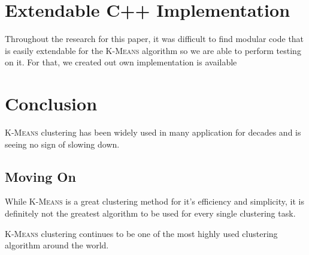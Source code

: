 \documentclass[12pt]{dalthesis}
\newcommand*{\kmeans}{\textsc{K-Means} } %
\begin{document}
\chapter{Extendable C++ Implementation}

Throughout the research for this paper, it was difficult to find modular code that is easily extendable for the \kmeans algorithm so we are able to perform testing on it. For that, we created out own implementation is available


\chapter{Conclusion}

\kmeans clustering has been widely used in many application for decades and is seeing no sign of slowing down. 

\section{Moving On}
While \kmeans is a great clustering method for it's efficiency and simplicity, it is definitely not the greatest algorithm to be used for every single clustering task. 


\kmeans clustering continues to be one of the most highly used clustering algorithm around the world.





\end{document}
